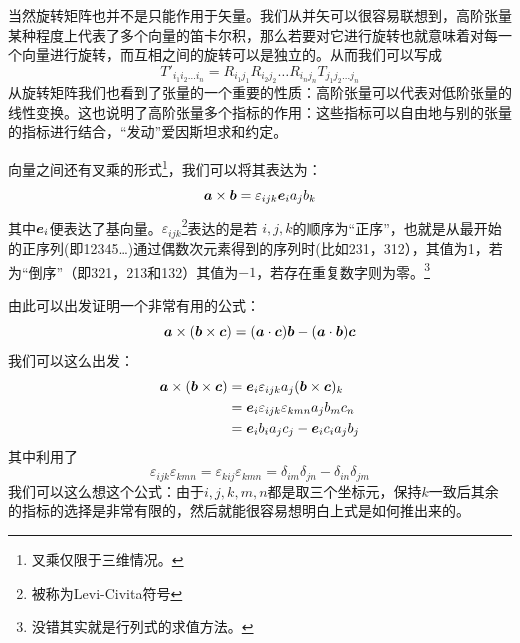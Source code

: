 \documentclass[12pt,a4paper,openany,twoside]{book}
\numberwithin{equation}{section}
\begin{document}
        当然旋转矩阵也并不是只能作用于矢量。我们从并矢可以很容易联想到，高阶张量某种程度上代表了多个向量的笛卡尔积，那么若要对它进行旋转也就意味着对每一个向量进行旋转，而互相之间的旋转可以是独立的。从而我们可以写成
        \begin{equation*}
          T'_{i_1i_2\dots i_n}=R_{i_1j_1}R_{i_2j_2}\dots R_{i_nj_n}T_{j_1j_2\dots j_n}
        \end{equation*} 
        从旋转矩阵我们也看到了张量的一个重要的性质：高阶张量可以代表对低阶张量的线性变换。这也说明了高阶张量多个指标的作用：这些指标可以自由地与别的张量的指标进行结合，“发动”爱因斯坦求和约定。

        向量之间还有叉乘的形式\footnote{叉乘仅限于三维情况。}，我们可以将其表达为：
        \begin{equation*}
          \vb*{a} \times \vb*{b} = \varepsilon_{ijk} \vb*{e}_i a_j b_k
        \end{equation*} 
        其中$\vb*{e}_i$便表达了基向量。$\varepsilon_{ijk}$\footnote{被称为Levi-Civita符号}表达的是若 $i,j,k$的顺序为“正序”，也就是从最开始的正序列(即12345\dots)通过偶数次元素得到的序列时(比如231，312），其值为1，若为“倒序”（即321，213和132）其值为$-1$，若存在重复数字则为零。\footnote{没错其实就是行列式的求值方法。}

        由此可以出发证明一个非常有用的公式：
        \begin{equation}
          \vb*{a}\times(\vb*{b}\times\vb*{c})=(\vb*{a}\cdot\vb*{c})\vb*{b}-(\vb*{a}\cdot\vb*{b})\vb*{c}
        \end{equation} 
        我们可以这么出发：
        \begin{align*}
          \vb*{a}\times(\vb*{b}\times\vb*{c})&=\vb*{e}_i\varepsilon_{ijk}a_j(\vb*{b}\times\vb*{c})_k\\
          &=\vb*{e}_i\varepsilon_{ijk}\varepsilon_{kmn}a_jb_mc_n \\
          &=\vb*{e}_ib_ia_jc_j-\vb*{e}_ic_ia_jb_j
        \end{align*}
        其中利用了
        \begin{equation}
          \varepsilon_{ijk}\varepsilon_{kmn}=\varepsilon_{kij}\varepsilon_{kmn}=\delta_{im}\delta_{jn}-\delta_{in}\delta_{jm}
        \end{equation} 
        我们可以这么想这个公式：由于$i,j,k,m,n$都是取三个坐标元，保持$k$一致后其余的指标的选择是非常有限的，然后就能很容易想明白上式是如何推出来的。
\end{document}
